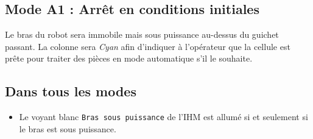 \subsection{Mode A1 : Arrêt en conditions initiales}
Le bras du robot sera immobile mais sous puissance au-dessus du guichet passant. La colonne sera \textit{Cyan} afin d'indiquer à l'opérateur que la cellule est prête pour traiter des pièces en mode automatique s'il le souhaite.

\subsection{Dans tous les modes}
\begin{itemize}
    \item Le voyant blanc \texttt{Bras sous puissance} de l'IHM est allumé si et seulement si le bras est sous puissance. 
\end{itemize}

